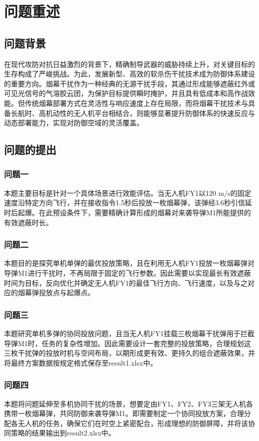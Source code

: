 \documentclass[5pt, withoutpreface,bwprint]{cumcmthesis} %
\begin{document}
\section{问题重述}
    
    \subsection{问题背景}
    
    在现代攻防对抗日益激烈的背景下，精确制导武器的威胁持续上升，对关键目标的生存构成了严峻挑战。为此，发展新型、高效的软杀伤干扰技术成为防御体系建设的重要方向。烟幕干扰作为一种经典的无源干扰手段，其通过形成能够遮蔽红外或可见光信号的气溶胶云团，为保护目标提供瞬时掩护，并且具有低成本和高作战效能。但传统烟幕部署方式在灵活性与响应速度上存在局限，而将烟幕干扰技术与具备长航时、高机动性的无人机平台相结合，则能够显著提升防御体系的快速反应与动态部署能力，实现对防御空域的灵活覆盖。
    
    
    \subsection{问题的提出}
        \subsubsection{问题一}
        本题主要目标是针对一个具体场景进行效能评估。当无人机FY1以120 m/s的固定速度沿特定方向飞行，并在接收指令1.5秒后投放一枚烟幕弹，该弹经3.6秒引信延时后起爆。在此预设条件下，需要精确计算形成的烟幕对来袭导弹M1所能提供的有效遮蔽时长。
        \subsubsection{问题二}
        本题目的是探究单机单弹的最优投放策略，且在利用无人机FY1投放一枚烟幕弹对导弹M1进行干扰时，不再局限于固定的飞行参数。因此需要以实现最长有效遮蔽时间为目标，反向优化并确定无人机FY1的最佳飞行方向、飞行速度，以及与之对应的烟幕弹投放点与起爆点。
        \subsubsection{问题三}
        本题研究单机多弹的协同投放问题，且当无人机FY1挂载三枚烟幕干扰弹用于拦截导弹M1时，任务的复杂性增加。因此需要设计一套完整的投放策略，合理规划这三枚干扰弹的投放时机与空间布局，以期形成更有效、更持久的组合遮蔽效果，并将最终方案数据按规定格式保存至result1.xlsx中。
        \subsubsection{问题四}
        本题将问题延伸至多机协同干扰的场景，想要定由FY1、FY2、FY3三架无人机各携带一枚烟幕弹，共同防御来袭导弹M1。即需要制定一个协同投放方案，合理分配各无人机的任务，确保它们在时空上紧密配合，形成理想的防御屏障，并将该协同策略的结果输出到result2.xlsx中。
\end{document}
